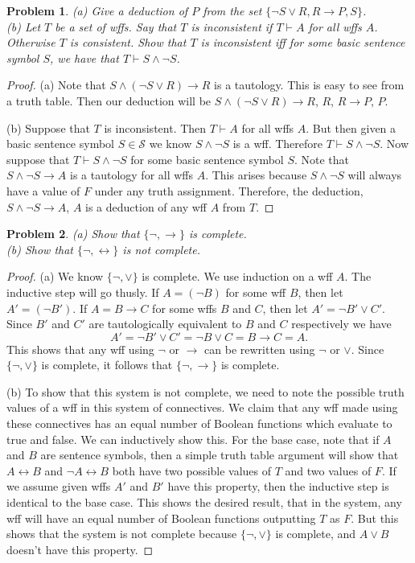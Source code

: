 \documentclass{article}
\newtheorem{problem}{Problem}
\begin{document}
\begin{problem}
(a) Give a deduction of $P$ from the set $\{\neg S \vee R, R \rightarrow P, S\}$.\\
(b) Let $T$ be a set of wffs. Say that $T$ is \emph{inconsistent} if $T \vdash A$ for all wffs $A$. Otherwise $T$ is consistent. Show that $T$ is inconsistent iff for some basic sentence symbol $S$, we have that $T \vdash S \wedge \neg S$.
\end{problem}
\begin{proof}
(a) Note that $S \wedge (\neg S \vee R) \rightarrow R$ is a tautology. This is easy to see from a truth table. Then our deduction will be $S \wedge (\neg S \vee R) \rightarrow R$, $R$, $R \rightarrow P$, $P$.

(b) Suppose that $T$ is inconsistent. Then $T \vdash A$ for all wffs $A$. But then given a basic sentence symbol $S \in \mathcal{S}$ we know $S \wedge \neg S$ is a wff. Therefore $T \vdash S \wedge \neg S$. Now suppose that $T \vdash S \wedge \neg S$ for some basic sentence symbol $S$. Note that $S \wedge \neg S \rightarrow A$ is a tautology for all wffs $A$. This arises because $S \wedge \neg S$ will always have a value of $F$ under any truth assignment. Therefore, the deduction, $S \wedge \neg S \rightarrow A$, $A$ is a deduction of any wff $A$ from $T$.
\end{proof}

\begin{problem}
(a) Show that $\{\neg, \rightarrow\}$ is complete.\\
(b) Show that $\{\neg, \leftrightarrow\}$ is not complete.
\end{problem}
\begin{proof}
(a) We know $\{\neg, \vee\}$ is complete. We use induction on a wff $A$. The inductive step will go thusly. If $A = (\neg B)$ for some wff $B$, then let $A' = (\neg B')$. If $A = B \rightarrow C$ for some wffs $B$ and $C$, then let $A' = \neg B' \vee C'$. Since $B'$ and $C'$ are tautologically equivalent to $B$ and $C$ respectively we have
\[
A' = \neg B' \vee C' = \neg B \vee C = B \rightarrow C = A.
\]
This shows that any wff using $\neg$ or $\rightarrow$ can be rewritten using $\neg$ or $\vee$. Since $\{\neg, \vee\}$ is complete, it follows that $\{\neg, \rightarrow\}$ is complete.

(b) To show that this system is not complete, we need to note the possible truth values of a wff in this system of connectives. We claim that any wff made using these connectives has an equal number of Boolean functions which evaluate to true and false. We can inductively show this. For the base case, note that if $A$ and $B$ are sentence symbols, then a simple truth table argument will show that $A \leftrightarrow B$ and $\neg A \leftrightarrow B$ both have two possible values of $T$ and two values of $F$. If we assume given wffs $A'$ and $B'$ have this property, then the inductive step is identical to the base case. This shows the desired result, that in the system, any wff will have an equal number of Boolean functions outputting $T$ as $F$. But this shows that the system is not complete because $\{\neg, \vee\}$ is complete, and $A \vee B$ doesn't have this property.
\end{proof}
\end{document}
